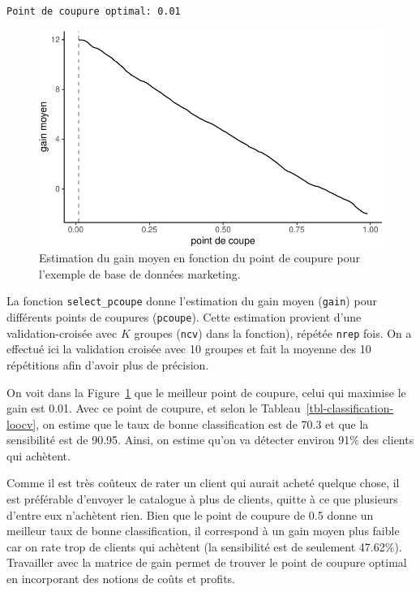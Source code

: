 \documentclass[
  11pt,
  letterpaper,
]{scrbook}
\theoremstyle{definition}
\theoremstyle{remark}
\begin{document}
\begin{verbatim}
Point de coupure optimal: 0.01 
\end{verbatim}

\begin{figure}[ht!]

{\centering \includegraphics{./05-reglogistique_files/figure-pdf/fig-coupure-pondere-1.pdf}

}

\caption{\label{fig-coupure-pondere}Estimation du gain moyen en fonction
du point de coupure pour l'exemple de base de données marketing.}

\end{figure}

La fonction \texttt{select\_pcoupe} donne l'estimation du gain moyen
(\texttt{gain}) pour différents points de coupures (\texttt{pcoupe}).
Cette estimation provient d'une validation-croisée avec \(K\) groupes
(\texttt{ncv}) dans la fonction), répétée \texttt{nrep} fois. On a
effectué ici la validation croisée avec 10 groupes et fait la moyenne
des 10 répétitions afin d'avoir plus de précision.

On voit dans la Figure~\ref{fig-coupure-pondere} que le meilleur point
de coupure, celui qui maximise le gain est 0.01. Avec ce point de
coupure, et selon le Tableau~\ref{tbl-classification-loocv}, on estime
que le taux de bonne classification est de 70.3 et que la sensibilité
est de 90.95. Ainsi, on estime qu'on va détecter environ 91\% des
clients qui achètent.

Comme il est très coûteux de rater un client qui aurait acheté quelque
chose, il est préférable d'envoyer le catalogue à plus de clients,
quitte à ce que plusieurs d'entre eux n'achètent rien. Bien que le point
de coupure de 0.5 donne un meilleur taux de bonne classification, il
correspond à un gain moyen plus faible car on rate trop de clients qui
achètent (la sensibilité est de seulement 47.62\%). Travailler avec la
matrice de gain permet de trouver le point de coupure optimal en
incorporant des notions de coûts et profits.
\end{document}

